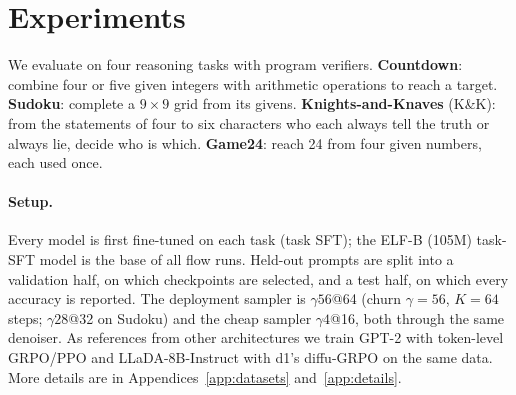 \section{Experiments}
\label{sec:experiments}
We evaluate \method{} on four reasoning tasks with program verifiers. \textbf{Countdown}: combine four or five given integers with arithmetic operations to reach a target. \textbf{Sudoku}: complete a $9\times9$ grid from its givens. \textbf{Knights-and-Knaves} (K\&K): from the statements of four to six characters who each always tell the truth or always lie, decide who is which. \textbf{Game24}: reach 24 from four given numbers, each used once.

\paragraph{Setup.}
Every model is first fine-tuned on each task (task SFT); the ELF-B (105M) task-SFT model is the base of all flow runs. Held-out prompts are split into a validation half, on which checkpoints are selected, and a test half, on which every accuracy is reported. The deployment sampler is $\gamma56$@64 (churn $\gamma{=}56$, $K{=}64$ steps; $\gamma28$@32 on Sudoku) and the cheap sampler $\gamma4$@16, both through the same denoiser. As references from other architectures we train GPT-2 \citep{radford2019gpt2} with token-level GRPO/PPO and LLaDA-8B-Instruct \citep{nie2025llada} with d1's diffu-GRPO \citep{zhao2025d1} on the same data. More details are in Appendices~\ref{app:datasets} and~\ref{app:details}.

